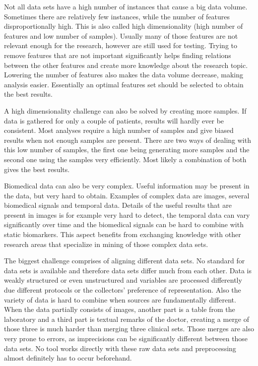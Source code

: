 \documentclass[10pt,a4paper]{report}
\begin{document}
	Not all data sets have a high number of instances that cause a big data volume. Sometimes there are relatively few instances, while the number of features disproportionally high\cite{dubitzky2007fundamentals}. This is also called high dimensionality (high number of features and low number of samples). Usually many of those features are not relevant enough for the research, however are still used for testing. Trying to remove features that are not important significantly helps finding relations between the other features and create more knowledge about the research topic. Lowering the number of features also makes the data volume decrease, making analysis easier. Essentially an optimal features set should be selected to obtain the best results\cite{PENG201015}.
	
	A high dimensionality challenge can also be solved by creating more samples. If data is gathered for only a couple of patients, results will hardly ever be consistent. Most analyses require a high number of samples and give biased results when not enough samples are present. There are two ways of dealing with this low number of samples, the first one being generating more samples\cite{dunbar2006spatial, devroye1986sample} and the second one using the samples very efficiently\cite{van2002gene, roff1989statistical}. Most likely a combination of both gives the best results. 
	
	Biomedical data can also be very complex. Useful information may be present in the data, but very hard to obtain. Examples of complex data are images, several biomedical signals and temporal data. Details of the useful results that are present in images is for example very hard to detect, the temporal data can vary significantly over time and the biomedical signals can be hard to combine with static biomarkers\cite{Yoo2012}. This aspect benefits from exchanging knowledge with other research areas that specialize in mining of those complex data sets\cite{Turkay2014, bellazzi2011data}.
	
	The biggest challenge comprises of aligning different data sets. No standard for data sets is available and therefore data sets differ much from each other. Data is weakly structured or even unstructured\cite{Holzinger2014} and variables are processed differently due different protocols or the collectors' preference of representation\cite{Otasek2014}. Also the variety of data is hard to combine when sources are fundamentally different. When the data partially consists of images, another part is a table from the laboratory and a third part is textual remarks of the doctor, creating a merge of those three is much harder than merging three clinical sets. Those merges are also very prone to errors, as imprecisions can be significantly different between those data sets. No tool works directly with these raw data sets and preprocessing almost definitely has to occur beforehand\cite{CIOS20021, Turkay2014}.
	
\end{document}
